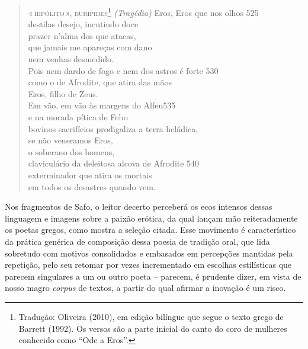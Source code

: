 \smallskip
\begin{verse}
\small{\textsc{«\,hipólito\,», eurípides}\footnote{Tradução: Oliveira (2010), em edição bilíngue que segue o texto grego de Barrett (1992). Os versos são a parte inicial do canto do coro de mulheres conhecido como ``Ode a Eros''.}
\textit{(Tragédia)}
\smallskip
Eros, Eros que nos olhos \num{525}\\
destilas desejo, incutindo doce\\ 
prazer n’alma dos que atacas,\\
que jamais me apareças com dano\\
nem venhas desmedido.\\
Pois nem dardo de fogo e nem dos astros é forte \num{530}\\
como o de Afrodite, que atira das mãos\\
Eros, filho de Zeus.\\

Em vão, em vão às margens do Alfeu\num{535}\\[5pt]
e na morada pítica de Febo\\
bovinos sacrifícios prodigaliza a terra heládica,\\
se não veneramos Eros,\\
o soberano dos homens,\\
claviculário da deleitosa alcova de Afrodite \num{540}\\
exterminador que atira os mortais\\
em todos os desastres quando vem.}
\end{verse}

Nos fragmentos de Safo, o leitor decerto perceberá os ecos intensos
dessas linguagem e imagens sobre a paixão erótica, da qual lançam mão
reiteradamente os poetas gregos, como mostra a seleção citada. Esse movimento é
característico da prática genérica de composição dessa poesia de tradição oral, que lida sobretudo com motivos consolidados e embasados em
percepções mantidas pela repetição, pelo seu retomar por vezes incrementado em
escolhas estilísticas que parecem singulares a um ou outro poeta -- parecem, é
prudente dizer, em vista de nosso magro \textit{corpus} de textos, a partir do
qual afirmar a inovação é um risco.



